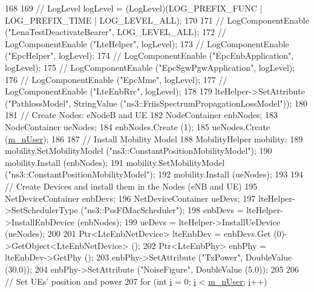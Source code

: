 \begin{DoxyCode}
168 
169   \textcolor{comment}{// LogLevel logLevel = (LogLevel)(LOG\_PREFIX\_FUNC | LOG\_PREFIX\_TIME | LOG\_LEVEL\_ALL);}
170 
171   \textcolor{comment}{// LogComponentEnable ("LenaTestDeactivateBearer", LOG\_LEVEL\_ALL);}
172   \textcolor{comment}{// LogComponentEnable ("LteHelper", logLevel);}
173   \textcolor{comment}{// LogComponentEnable ("EpcHelper", logLevel);}
174   \textcolor{comment}{// LogComponentEnable ("EpcEnbApplication", logLevel);}
175   \textcolor{comment}{// LogComponentEnable ("EpcSgwPgwApplication", logLevel);}
176   \textcolor{comment}{// LogComponentEnable ("EpcMme", logLevel);}
177   \textcolor{comment}{// LogComponentEnable ("LteEnbRrc", logLevel);}
178 
179   lteHelper->SetAttribute (\textcolor{stringliteral}{"PathlossModel"}, StringValue (\textcolor{stringliteral}{"ns3::FriisSpectrumPropagationLossModel"}));
180 
181   \textcolor{comment}{// Create Nodes: eNodeB and UE}
182   NodeContainer enbNodes;
183   NodeContainer ueNodes;
184   enbNodes.Create (1);
185   ueNodes.Create (\hyperlink{classns3_1_1LenaDeactivateBearerTestCase_a119f58840a145a5be90eef6e01784ee6}{m\_nUser});
186 
187   \textcolor{comment}{// Install Mobility Model}
188   MobilityHelper mobility;
189   mobility.SetMobilityModel (\textcolor{stringliteral}{"ns3::ConstantPositionMobilityModel"});
190   mobility.Install (enbNodes);
191   mobility.SetMobilityModel (\textcolor{stringliteral}{"ns3::ConstantPositionMobilityModel"});
192   mobility.Install (ueNodes);
193 
194   \textcolor{comment}{// Create Devices and install them in the Nodes (eNB and UE)}
195   NetDeviceContainer enbDevs;
196   NetDeviceContainer ueDevs;
197   lteHelper->SetSchedulerType (\textcolor{stringliteral}{"ns3::PssFfMacScheduler"});
198   enbDevs = lteHelper->InstallEnbDevice (enbNodes);
199   ueDevs = lteHelper->InstallUeDevice (ueNodes);
200 
201   Ptr<LteEnbNetDevice> lteEnbDev = enbDevs.Get (0)->GetObject<LteEnbNetDevice> ();
202   Ptr<LteEnbPhy> enbPhy = lteEnbDev->GetPhy ();
203   enbPhy->SetAttribute (\textcolor{stringliteral}{"TxPower"}, DoubleValue (30.0));
204   enbPhy->SetAttribute (\textcolor{stringliteral}{"NoiseFigure"}, DoubleValue (5.0));
205 
206   \textcolor{comment}{// Set UEs' position and power}
207   \textcolor{keywordflow}{for} (\textcolor{keywordtype}{int} \hyperlink{bernuolliDistribution_8m_a6f6ccfcf58b31cb6412107d9d5281426}{i} = 0; \hyperlink{bernuolliDistribution_8m_a6f6ccfcf58b31cb6412107d9d5281426}{i} < \hyperlink{classns3_1_1LenaDeactivateBearerTestCase_a119f58840a145a5be90eef6e01784ee6}{m\_nUser}; \hyperlink{bernuolliDistribution_8m_a6f6ccfcf58b31cb6412107d9d5281426}{i}++)

\end{DoxyCode}
